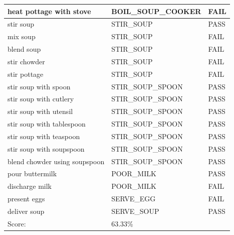 \documentclass[11pt]{article}
\begin{document}
\begin{appendices}
\begin{table}[H]
\begin{tabular}{lll}
\multicolumn{1}{l|}{heat pottage with stove}        & \multicolumn{1}{l|}{BOIL\_SOUP\_COOKER} & \cellcolor[HTML]{FD6864}FAIL \\ \hline
\multicolumn{1}{l|}{stir soup}                      & \multicolumn{1}{l|}{STIR\_SOUP}         & \cellcolor[HTML]{67FD9A}PASS \\ \hline
\multicolumn{1}{l|}{mix soup}                       & \multicolumn{1}{l|}{STIR\_SOUP}         & \cellcolor[HTML]{FD6864}FAIL \\ \hline
\multicolumn{1}{l|}{blend soup}                     & \multicolumn{1}{l|}{STIR\_SOUP}         & \cellcolor[HTML]{FD6864}FAIL \\ \hline
\multicolumn{1}{l|}{stir chowder}                   & \multicolumn{1}{l|}{STIR\_SOUP}         & \cellcolor[HTML]{FD6864}FAIL \\ \hline
\multicolumn{1}{l|}{stir pottage}                   & \multicolumn{1}{l|}{STIR\_SOUP}         & \cellcolor[HTML]{FD6864}FAIL \\ \hline
\multicolumn{1}{l|}{stir soup with spoon}           & \multicolumn{1}{l|}{STIR\_SOUP\_SPOON}  & \cellcolor[HTML]{67FD9A}PASS \\ \hline
\multicolumn{1}{l|}{stir soup with cutlery}         & \multicolumn{1}{l|}{STIR\_SOUP\_SPOON}  & \cellcolor[HTML]{67FD9A}PASS \\ \hline
\multicolumn{1}{l|}{stir soup with utensil}         & \multicolumn{1}{l|}{STIR\_SOUP\_SPOON}  & \cellcolor[HTML]{67FD9A}PASS \\ \hline
\multicolumn{1}{l|}{stir soup with tablespoon}      & \multicolumn{1}{l|}{STIR\_SOUP\_SPOON}  & \cellcolor[HTML]{67FD9A}PASS \\ \hline
\multicolumn{1}{l|}{stir soup with teaspoon}        & \multicolumn{1}{l|}{STIR\_SOUP\_SPOON}  & \cellcolor[HTML]{67FD9A}PASS \\ \hline
\multicolumn{1}{l|}{stir soup with soupspoon}       & \multicolumn{1}{l|}{STIR\_SOUP\_SPOON}  & \cellcolor[HTML]{67FD9A}PASS \\ \hline
\multicolumn{1}{l|}{blend chowder using soupspoon}  & \multicolumn{1}{l|}{STIR\_SOUP\_SPOON}  & \cellcolor[HTML]{67FD9A}PASS \\ \hline
\multicolumn{1}{l|}{pour buttermilk}                   & \multicolumn{1}{l|}{POOR\_MILK}         & \cellcolor[HTML]{67FD9A}PASS \\ \hline
\multicolumn{1}{l|}{discharge milk}                   & \multicolumn{1}{l|}{POOR\_MILK}         & \cellcolor[HTML]{FD6864}FAIL \\ \hline
\multicolumn{1}{l|}{present eggs}                   & \multicolumn{1}{l|}{SERVE\_EGG}         & \cellcolor[HTML]{FD6864}FAIL \\ \hline
\multicolumn{1}{l|}{deliver soup}                   & \multicolumn{1}{l|}{SERVE\_SOUP}         & \cellcolor[HTML]{67FD9A}PASS \\ \hline
\multicolumn{1}{l|}{Score:}                         & \multicolumn{1}{l|}{63.33\%}            &                              \\


\end{tabular}
\end{table}
\end{appendices}
\end{document}
